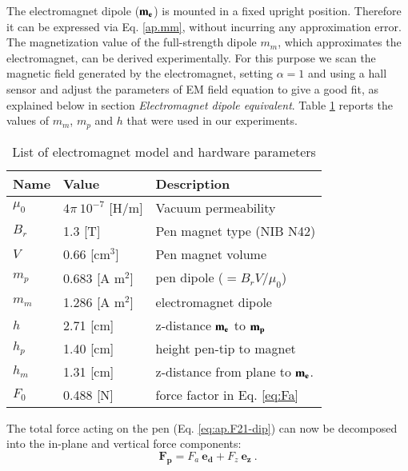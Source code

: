     The electromagnet dipole ($\mathbf{m_e}$) is mounted in a fixed upright position. Therefore it can be expressed via Eq. \ref{ap.mm}, without incurring any approximation error.
    The magnetization value of the full-strength dipole $m_m$, which approximates the electromagnet, can be derived experimentally. For this purpose we scan the magnetic field generated by the electromagnet, setting $\alpha = 1$ and using a hall sensor and adjust the parameters of EM field equation to give a good fit, as explained below in section \textit{Electromagnet dipole equivalent}. Table \ref{tab:ap:em_model} reports the values of $m_m$, $m_p$ and $h$ that were used in our experiments.
    
    \begin{table}[tb]
      \caption{List of electromagnet model and hardware parameters}
      \label{tab:ap:em_model}
      \begin{tabular}{lll}
        \toprule
        Name&Value&Description\\
        \midrule
        $\mu_0$ & $4\pi \ 10^{-7}$ [H/m] & Vacuum permeability \\
        $B_r$ & 1.3 [T] & Pen magnet type (NIB N42) \\
        $V$ & 0.66 [cm$^3$] & Pen magnet volume \\
        $m_p$ & 0.683 [A m$^2$]& pen dipole ($=B_r V / \mu_0$)\\
        $m_m$ & 1.286 [A m$^2$]& electromagnet dipole\\
        $h$ & 2.71 [cm] & z-distance $\mathbf{m_e}$ to $\mathbf{m_p}$ \\
        $h_p$ & 1.40 [cm] & height pen-tip to magnet \\
        $h_m$ & 1.31 [cm] & z-distance from plane to $\mathbf{m_e}$.\\  
        $F_0$ & 0.488 [N] & force factor in Eq. \ref{eq:Fa} \\
      \bottomrule
    \end{tabular}
    \end{table}
    
    The total force acting on the pen (Eq. \ref{eq:ap.F21-dip}) can now be decomposed into the in-plane and vertical force components: 
    \begin{equation}
        \mathbf{F_p} = F_a \ \mathbf{e_d} + F_z  \ \mathbf{e_z} \ . \label{eq:ap:Fp_decomp}
    \end{equation}
    
